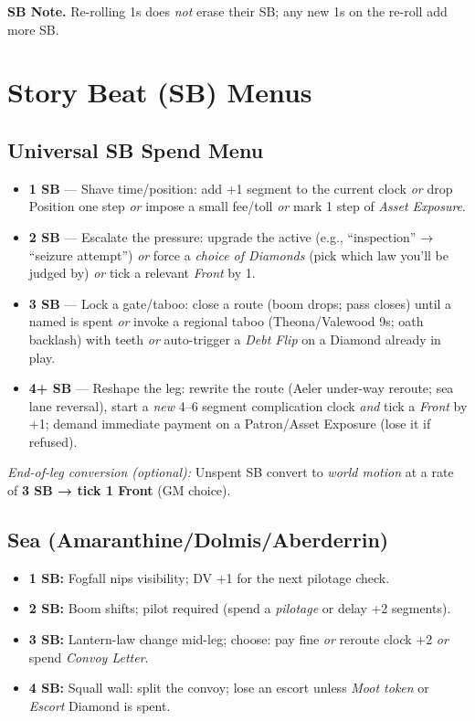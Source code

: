\noindent\textbf{SB Note.} Re-rolling 1s does \emph{not} erase their SB; any new 1s on the re-roll add more SB.

\section{Story Beat (SB) Menus}

\subsection{Universal SB Spend Menu}
\begin{itemize}
  \item \textbf{1 SB} — Shave time/position: add +1 segment to the current clock \emph{or} drop Position one step \emph{or} impose a small fee/toll \emph{or} mark 1 step of \emph{Asset Exposure}.
  \item \textbf{2 SB} — Escalate the pressure: upgrade the active \SuitClub{} (e.g., ``inspection'' → ``seizure attempt'') \emph{or} force a \emph{choice of Diamonds} (pick which law you'll be judged by) \emph{or} tick a relevant \emph{Front} by 1.
  \item \textbf{3 SB} — Lock a gate/taboo: close a route (boom drops; pass closes) until a named \SuitDiamond{} is spent \emph{or} invoke a regional taboo (Theona/Valewood 9s; oath backlash) with teeth \emph{or} auto-trigger a \emph{Debt Flip} on a Diamond already in play.
  \item \textbf{4+ SB} — Reshape the leg: rewrite the route (Aeler under-way reroute; sea lane reversal), start a \emph{new} 4--6 segment complication clock \emph{and} tick a \emph{Front} by +1; demand immediate payment on a Patron/Asset Exposure (lose it if refused).
\end{itemize}
\textit{End-of-leg conversion (optional):} Unspent SB convert to \emph{world motion} at a rate of \textbf{3 SB → tick 1 Front} (GM choice).

\subsection{Sea (Amaranthine/Dolmis/Aberderrin)}
\begin{itemize}
  \item \textbf{1 SB:} Fogfall nips visibility; DV +1 for the next pilotage check.
  \item \textbf{2 SB:} Boom shifts; pilot required (spend a \emph{pilotage} \SuitDiamond{} or delay +2 segments).
  \item \textbf{3 SB:} Lantern-law change mid-leg; choose: pay fine \emph{or} reroute clock +2 \emph{or} spend \emph{Convoy Letter}.
  \item \textbf{4 SB:} Squall wall: split the convoy; lose an escort unless \emph{Moot token} or \emph{Escort} Diamond is spent.
\end{itemize}


